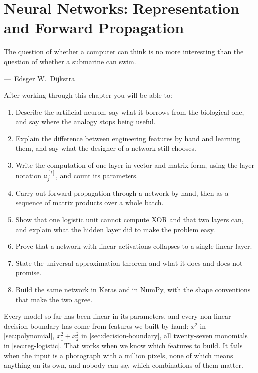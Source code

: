 
\chapter{Neural Networks: Representation and Forward Propagation}
\label{ch:ch08}

\epigraph{The question of whether a computer can think is no more interesting
than the question of whether a submarine can swim.}{---\ Edsger W.~Dijkstra}

\begin{chapterlearning}
After working through this chapter you will be able to:
\begin{enumerate}
  \item Describe the artificial neuron, say what it borrows from the biological
        one, and say where the analogy stops being useful.
  \item Explain the difference between engineering features by hand and
        learning them, and say what the designer of a network still chooses.
  \item Write the computation of one layer in vector and matrix form, using the
        layer notation $a^{[l]}_j$, and count its parameters.
  \item Carry out forward propagation through a network by hand, then as a
        sequence of matrix products over a whole batch.
  \item Show that one logistic unit cannot compute XOR and that two layers can,
        and explain what the hidden layer did to make the problem easy.
  \item Prove that a network with linear activations collapses to a single
        linear layer.
  \item State the universal approximation theorem and what it does and does not
        promise.
  \item Build the same network in Keras and in NumPy, with the shape conventions
        that make the two agree.
\end{enumerate}
\end{chapterlearning}

Every model so far has been linear in its parameters, and every non-linear
decision boundary has come from features we built by hand: $x^2$ in
\cref{sec:polynomial}, $x_1^2 + x_2^2$ in \cref{sec:decision-boundary}, all
twenty-seven monomials in \cref{sec:reg-logistic}. That works when we know which
features to build. It fails when the input is a photograph with a million
pixels, none of which means anything on its own, and nobody can say which
combinations of them matter.

